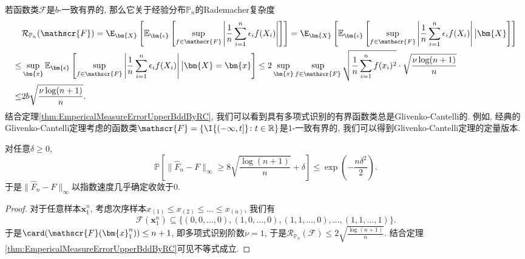\begin{remark}
	若函数类$\mathscr{F}$是$b$-一致有界的, 那么它关于经验分布$\mathbb{P}_n$的Rademacher复杂度
	\begin{align*}
		& \mathcal{R}_{\mathbb{P}_n}(\mathscr{F})
		= \E_{\bm{X}} \left[ \mathbb{E}_{\bm{\epsilon}} \left[ \sup_{f \in \mathscr{F}} \left| \frac{1}{n} \sum_{i=1}^n \epsilon_i f(X_i) \right| \right] \right]
		= \E_{\bm{X}} \left[ \mathbb{E}_{\bm{\epsilon}} \left[ \sup_{f \in \mathscr{F}} \left| \frac{1}{n} \sum_{i=1}^n \epsilon_i f(X_i) \right| \big| \bm{X} \right] \right] \\
		\leq & \sup_{\bm{x}} \mathbb{E}_{\bm{\epsilon}} \left[ \sup_{f \in \mathscr{F}} \left| \frac{1}{n} \sum_{i=1}^n \epsilon_i f(X_i) \right| \big| \bm{X} = \bm{x} \right]
		\leq 2 \sup_{\bm{x}} \sup_{f \in \mathscr{F}} \sqrt{\frac{1}{n} \sum_{i=1}^n f(x_i)^2} \cdot \sqrt{\frac{\nu \log(n+1)}{n}} \\
		\leq & 2 b \sqrt{\frac{\nu \log(n+1)}{n}}. 
	\end{align*} 
	结合定理\ref{thm:EmpericalMeasureErrorUpperBddByRC}, 我们可以看到具有多项式识别的有界函数类总是Glivenko-Cantelli的. 
	例如, 经典的Glivenko-Cantelli定理考虑的函数类$\mathscr{F} = \{\I{(- \infty, t]} \colon t \in \mathbb{R} \}$是$1$-一致有界的, 我们可以得到Glivenko-Cantelli定理的定量版本. 
\end{remark}

\begin{corollary}\label{thm:Glivenko-Cantelli}
	对任意$\delta \geq 0$, 
	\begin{equation*}
		\mathbb{P}\left[ \|\hat F_n - F \|_{\infty} \geq 8 \sqrt{\frac{\log(n+1)}{n}} + \delta \right]
		\leq \exp\left(- \frac{n \delta^2}{2}\right). 
	\end{equation*}
	于是$\|\hat F_n - F \|_{\infty}$以指数速度几乎确定收敛于$0$.   
\end{corollary}
\begin{proof}
	对于任意样本$\bm{x}_1^n$, 考虑次序样本$x_{(1)} \leq x_{(2)} \leq \dots \leq x_{(n)}$, 我们有
	\begin{equation*}
		\mathscr{F}(\bm{x}_1^n) \subseteq \{(0,0, \dots, 0), (1,0, \dots, 0), (1,1, \dots, 0), \dots, (1,1,\dots, 1) \}. 
	\end{equation*}
	于是$\card(\mathscr{F}(\bm{x}_1^n)) \leq n+1$, 即多项式识别阶数$\nu = 1$, 于是$\mathcal{R}_{\mathbb{P}_n}(\mathscr{F}) \leq 2 \sqrt{\frac{\log(n+1)}{n}}$. 
	结合定理\ref{thm:EmpericalMeasureErrorUpperBddByRC}可见不等式成立. 
\end{proof}


